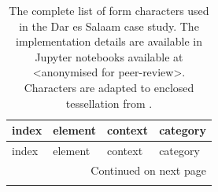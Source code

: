 \begin{longtable}{p{5cm}p{4cm}p{4cm}l}
    \caption{The complete list of form characters used in the Dar es Salaam case study. The implementation details are available
    in Jupyter notebooks available at <anonymised for peer-review>.
    Characters are adapted to enclosed tessellation from \cite{fleischmann2021methodological}.}
    \label{tab:form_des} \\
    \toprule
                                   index &                         element &                    context &     category \\
    \midrule
    \endfirsthead

    \toprule
                                   index &                         element &                    context &     category \\
    \midrule
    \endhead
    \midrule
    \multicolumn{4}{r}{{Continued on next page}} \\
    \midrule
    \endfoot


\end{longtable}
